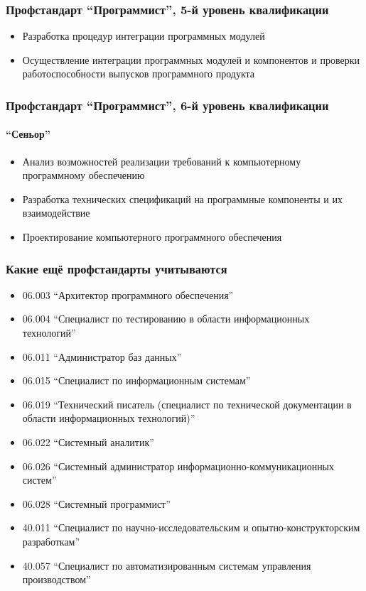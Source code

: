 \documentclass{../../slides-style}
\begin{document}
    \begin{frame}
        \frametitle{Профстандарт \enquote{Программист}, 5-й уровень квалификации}
        \begin{itemize}
            \item Разработка процедур интеграции программных модулей
            \item Осуществление интеграции программных модулей и компонентов и проверки работоспособности выпусков программного продукта
        \end{itemize}
    \end{frame}

    \begin{frame}
        \frametitle{Профстандарт \enquote{Программист}, 6-й уровень квалификации}
        \framesubtitle{\enquote{Сеньор}}
        \begin{itemize}
            \item Анализ возможностей реализации требований к компьютерному программному обеспечению
            \item Разработка технических спецификаций на программные компоненты и их взаимодействие
            \item Проектирование компьютерного программного обеспечения
        \end{itemize}
    \end{frame}

    \begin{frame}
        \frametitle{Какие ещё профстандарты учитываются}
        \begin{footnotesize}
            \begin{itemize}
                \item 06.003 \enquote{Архитектор программного обеспечения}
                \item 06.004 \enquote{Специалист по тестированию в области информационных технологий}
                \item 06.011 \enquote{Администратор баз данных}
                \item 06.015 \enquote{Специалист по информационным системам}
                \item 06.019 \enquote{Технический писатель (специалист по технической документации в области информационных технологий)}
                \item 06.022 \enquote{Системный аналитик}
                \item 06.026 \enquote{Системный администратор информационно-коммуникационных систем}
                \item 06.028 \enquote{Системный программист}
                \item 40.011 \enquote{Специалист по научно-исследовательским и опытно-конструкторским разработкам}
                \item 40.057 \enquote{Специалист по автоматизированным системам управления производством}
            \end{itemize}
        \end{footnotesize}
    \end{frame}
\end{document}

